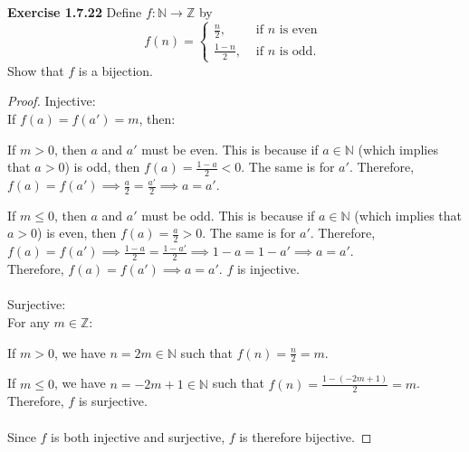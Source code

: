 \documentclass[12pt]{article}
\newcommand{\bbN}{\mathbb{N}}
\newcommand{\bbZ}{\mathbb{Z}}
\theoremstyle{definition}
\numberwithin{equation}{subsection}
\begin{document}
\textbf{Exercise 1.7.22} Define \(f: \mathbb{N} \rightarrow \mathbb{Z}\) by
$$
f(n)=\left\{\begin{array}{ll}{\frac{n}{2},} & {\text { if } n \text { is even }} \\ {\frac{1-n}{2},} & {\text { if } n \text { is odd. }}\end{array}\right.
$$
Show that \(f\) is a bijection.
\begin{proof}
Injective:\\
If $f(a)=f(a')=m$, then:

If $m>0$, then $a$ and $a'$ must be even. This is because if $a \in \bbN$ (which implies that $a>0$) is odd, then $f(a) = \frac{1-a}{2} <0 $. The same is for $a'$. Therefore, $f(a)=f(a') \implies \frac{a}{2} = \frac{a'}{2} \implies a=a'$.

If $m\leq0$, then $a$ and $a'$ must be odd. This is because if $a \in \bbN$ (which implies that $a>0$) is even, then $f(a) = \frac{a}{2} >0 $. The same is for $a'$. Therefore, $f(a)=f(a') \implies \frac{1-a}{2} = \frac{1-a'}{2} \implies 1-a=1-a'\implies a=a'$.
\\
Therefore, $f(a)=f(a') \implies a=a'$. $f$ is injective.
\\
\smallskip\\
Surjective:\\
For any $m \in \bbZ$:

If $m>0$, we have $n=2m \in \bbN$ such that $f(n)=\frac{n}{2}=m$.

If $m\leq0$, we have $n=-2m+1 \in \bbN$ such that $f(n)=\frac{1-(-2m+1)}{2}=m$.
\\
Therefore, $f$ is surjective.\\
\smallskip\\
Since $f$ is both injective and surjective, $f$ is therefore bijective.
\end{proof}
\end{document}
